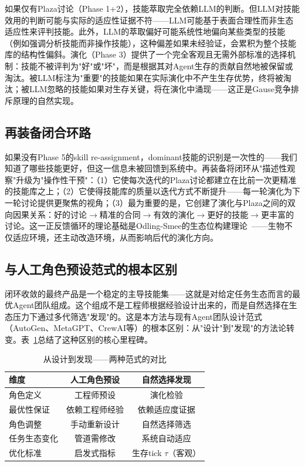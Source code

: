 \documentclass[12pt,a4paper]{ctexart}
\begin{document}
如果仅有Plaza讨论（Phase 1+2），技能萃取完全依赖LLM的判断。但LLM对技能效用的判断可能与实际的适应性证据不符——LLM可能基于表面合理性而非生态适应性来评判技能。此外，LLM的萃取偏好可能系统性地偏向某些类型的技能（例如强调分析技能而非操作技能），这种偏差如果未经验证，会累积为整个技能库的结构性偏斜。演化（Phase 3）提供了一个完全客观且无需外部标准的选择机制：技能不被评判为"好"或"坏"，而是根据其对Agent生存的贡献自然地被保留或淘汰。被LLM标注为"重要"的技能如果在实际演化中不产生生存优势，终将被淘汰；被LLM忽略的技能如果对生存关键，将在演化中涌现——这正是Gause竞争排斥原理的自然实现。

\subsection{再装备闭合环路}

如果没有Phase 5的skill re-assignment，dominant技能的识别是一次性的——我们知道了哪些技能更好，但这一信息未被回馈到系统中。再装备将闭环从"描述性观察"升级为"操作性干预"：（1）它使每次迭代的Plaza讨论都建立在比前一次更精准的技能库之上；（2）它使得技能库的质量以迭代方式不断提升——每一轮演化为下一轮讨论提供更聚焦的视角；（3）最为重要的是，它创建了演化与Plaza之间的双向因果关系：好的讨论$\to$精准的合同$\to$有效的演化$\to$更好的技能$\to$更丰富的讨论。这一正反馈循环的理论基础是Odling-Smee的生态位构建理论~\cite{odling2003niche}——生物不仅适应环境，还主动改造环境，从而影响后代的演化方向。

\subsection{与人工角色预设范式的根本区别}

闭环收敛的最终产品是一个稳定的主导技能集——这就是对给定任务生态而言的最优Agent团队组成。这个组成不是工程师根据经验设计出来的，而是自然选择在生态压力下通过多代筛选"发现"的。这是本方法与现有Agent团队设计范式（AutoGen、MetaGPT、CrewAI等）的根本区别：从"设计"到"发现"的方法论转变。表~\ref{tab:paradigm_shift}总结了这种区别的核心里程碑。

\begin{table}[H]
\centering
\caption{从设计到发现——两种范式的对比}
\label{tab:paradigm_shift}
\renewcommand{\arraystretch}{1.2}
\begin{tabular}{lcc}
\toprule
维度 & 人工角色预设 & 自然选择发现 \\
\midrule
角色定义 & 工程师预设 & 演化检验 \\
最优性保证 & 依赖工程师经验 & 依赖适应度证据 \\
角色调整 & 手动重新设计 & 自然选择筛选 \\
任务生态变化 & 管道需修改 & 系统自动适应 \\
优化标准 & 启发式指标 & 生存tick $\tau$（客观） \\
\bottomrule
\end{tabular}
\end{table}
\end{document}
